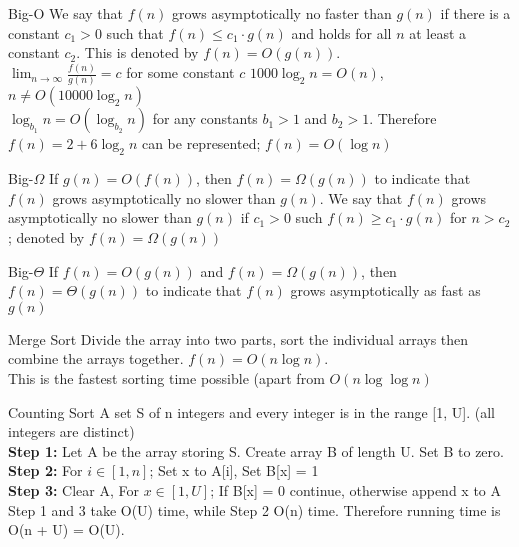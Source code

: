 \documentclass{lecture}
\begin{document}
\begin{landscape}
\begin{multicols}{3}
    \begin{note}{Big-O}
        We say that $f(n)$ grows asymptotically no faster than $g(n)$ if there is a constant $c_1>0$ such that $f(n)\leq c_1\cdot g(n)$ and holds for all $n$ at least a constant $c_2$. This is denoted by $f(n)=O(g(n))$.\\
        $\lim_{n\rightarrow\infty}\frac{f(n)}{g(n)}=c$ for some constant $c$
        $1000\log_2n=O(n)$,\\$n\neq O(10000\log_2n)$\\
        $\log_{b_1}n=O(\log_{b_2}n)$ for any constants $b_1>1$ and $b_2>1$.
        Therefore $f(n)=2+6\log_2n$ can be represented; $f(n)=O(\log n)$
    \end{note}
    \vfill
    \begin{note}{Big-$\Omega$}
        If $g(n)=O(f(n))$, then $f(n)=\Omega(g(n))$ to indicate that $f(n)$ grows asymptotically no slower than $g(n)$. We say that $f(n)$ grows asymptotically no slower than $g(n)$ if $c_1>0$ such $f(n)\geq c_1\cdot g(n)$ for $n>c_2$; denoted by $f(n)=\Omega(g(n))$
    \end{note}
    \vfill
    \begin{note}{Big-$\Theta$}
        If $f(n)=O(g(n))$ and $f(n)=\Omega(g(n))$, then $f(n)=\Theta(g(n))$ to indicate that $f(n)$ grows asymptotically as fast as $g(n)$
    \end{note}

    \vspace{1em}
    \begin{note}{Merge Sort}
        Divide the array into two parts, sort the individual arrays then combine the arrays together. $f(n)=O(n\log n)$.\\
        This is the fastest sorting time possible (apart from $O(n\log\log n)$
    \end{note}
    \vfill
    \begin{note}{Counting Sort}
        A set S of n integers and every integer is in the range [1, U]. (all integers are distinct)\\
        \textbf{Step 1:} Let A be the array storing S. Create array B of length U. Set B to zero.\\
        \textbf{Step 2:} For $i\in [1,n]$; Set x to A[i], Set B[x] = 1\\
        \textbf{Step 3:} Clear A, For $x\in[1,U]$; If B[x] = 0 continue, otherwise append x to A
        Step 1 and 3 take O(U) time, while Step 2 O(n) time. Therefore running time is O(n + U) = O(U).
    \end{note}
    \vfill


\end{multicols}
\end{landscape}
\end{document}

